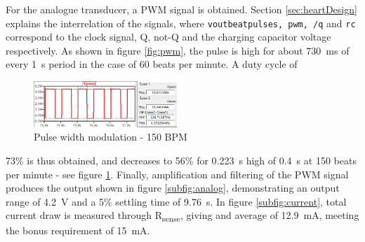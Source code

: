For the analogue transducer, a PWM signal is obtained. Section \ref{sec:heartDesign} explains the interrelation of the signals, where \texttt{voutbeatpulses, pwm, /q} and \texttt{rc} correspond to the clock signal, Q, not-Q and the charging capacitor voltage respectively. As shown in figure \ref{fig:pwm}, the pulse is high for about \SI{730}{ms} of every \SI{1}{s} period in the case of 60 beats per minute. A duty cycle of
\begin{figure}
    \centering
    \includegraphics[width = 0.48\textwidth]{./Figures/curses}
    \caption{Pulse width modulation - 150 BPM}
    \label{fig:curses}
\end{figure}
73\% is thus obtained, and decreases to 56\% for \SI{0.223}{s} high of \SI{0.4}{s} at 150 beats per minute - see figure \ref{fig:curses}. Finally, amplification and filtering of the PWM signal produces the output shown in figure \ref{subfig:analog}, demonstrating an output range of \SI{4.2}{V} and a 5\% settling time of \SI{9.76}{s}. In figure \ref{subfig:current}, total current draw is measured through R\textsubscript{sense}, giving and average of \SI{12.9}{mA}, meeting the bonus requirement of \SI{15}{mA}.

